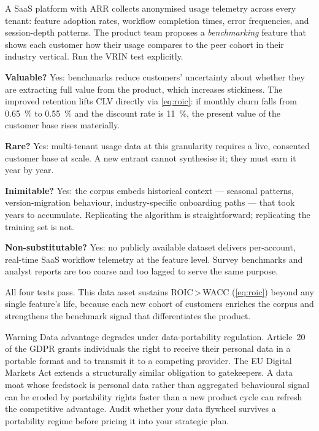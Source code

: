 \begin{example}
A SaaS platform with  ARR collects anonymised usage telemetry across every tenant: feature
adoption rates, workflow completion times, error frequencies, and session-depth patterns. The product
team proposes a \emph{benchmarking} feature that shows each customer how their usage compares to
the peer cohort in their industry vertical. Run the VRIN test explicitly.

\textbf{Valuable?} Yes: benchmarks reduce customers' uncertainty about whether they are extracting
full value from the product, which increases stickiness. The improved retention lifts CLV directly
via \cref{eq:roic}: if monthly churn falls from \qty{0.65}{\percent} to \qty{0.55}{\percent} and
the discount rate is \qty{11}{\percent}, the present value of the customer base rises materially.

\textbf{Rare?} Yes: multi-tenant usage data at this granularity requires a live, consented customer
base at scale. A new entrant cannot synthesise it; they must earn it year by year.

\textbf{Inimitable?} Yes: the corpus embeds historical context — seasonal patterns, version-migration
behaviour, industry-specific onboarding paths — that took years to accumulate. Replicating the
algorithm is straightforward; replicating the training set is not.

\textbf{Non-substitutable?} Yes: no publicly available dataset delivers per-account, real-time
SaaS workflow telemetry at the feature level. Survey benchmarks and analyst reports are too coarse
and too lagged to serve the same purpose.

All four tests pass. This data asset sustains ROIC\,>\,WACC (\cref{eq:roic}) beyond any single
feature's life, because each new cohort of customers enriches the corpus and strengthens the
benchmark signal that differentiates the product.
\end{example}

\begin{admonition}{Warning}
Data advantage degrades under data-portability regulation. Article~20 of the GDPR grants individuals
the right to receive their personal data in a portable format and to transmit it to a competing
provider. The EU Digital Markets Act extends a structurally similar obligation to gatekeepers. A
data moat whose feedstock is personal data rather than aggregated behavioural signal can be
eroded by portability rights faster than a new product cycle can refresh the competitive advantage.
Audit whether your data flywheel survives a portability regime before pricing it into your
strategic plan.
\end{admonition}

